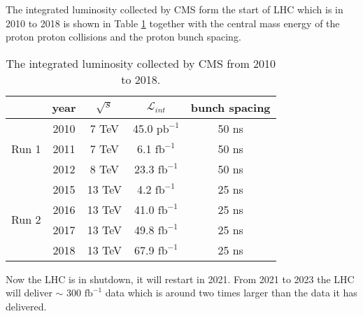 The integrated luminosity collected by CMS form the start of LHC which is in 2010 to 2018 is shown in Table \ref{tab:CMS_Lumi} together with the central mass energy of the proton proton collisions and the proton bunch spacing.
\begin{table}[!hbpt]
\begin{center}
\begin{tabular}{|c|c|c|c|c|}
\hline
                       & year & $\sqrt{s}$ & $\mathcal{L}_{int}$ & bunch spacing \\ \hline
\multirow{3}{*}{Run 1} & 2010 & 7 TeV  & 45.0  $\textrm{pb}^{-1}$  & 50 ns                \\ \cline{2-5}
                       & 2011 & 7 TeV  & 6.1   $\textrm{fb}^{-1}$  & 50 ns               \\ \cline{2-5}
                       & 2012 & 8 TeV  & 23.3  $\textrm{fb}^{-1}$  & 50 ns               \\ \hline
\multirow{4}{*}{Run 2} & 2015 & 13 TeV & 4.2   $\textrm{fb}^{-1}$  & 25 ns               \\ \cline{2-5}
                       & 2016 & 13 TeV & 41.0  $\textrm{fb}^{-1}$  & 25 ns               \\ \cline{2-5}
                       & 2017 & 13 TeV & 49.8  $\textrm{fb}^{-1}$  & 25 ns               \\ \cline{2-5}
                       & 2018 & 13 TeV & 67.9  $\textrm{fb}^{-1}$  & 25 ns               \\ \hline

\end{tabular}
\end{center}
\caption{The integrated luminosity collected by CMS from 2010 to 2018.}
\label{tab:CMS_Lumi}
\end{table}

Now the LHC is in shutdown, it will restart in 2021. From 2021 to 2023 the LHC will deliver $\sim$ 300 $\textrm{fb}^{-1}$ data which is around two times larger than the data it has delivered.

 